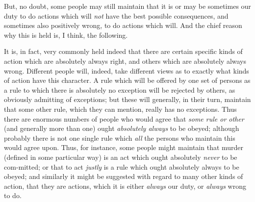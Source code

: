 But, no doubt, some people may still maintain that it is or may be
sometimes our duty to do actions which will \textit{not} have the best
possible consequences, and sometimes  also positively wrong,
to do actions which will. And the chief reason why this is held is, I
think, the following.

It is, in fact, very commonly held indeed that there are certain
specific kinds of action which are absolutely always right, and others
which are absolutely always wrong. Different people will, indeed, take
different views as to exactly what kinds of action have this
character. A rule which will be offered by one set of persons as a
rule to which there is absolutely no exception will be rejected by
others, as obviously admitting of exceptions; but these will
generally, in their turn, maintain that some other rule, which they
can mention, really has no exceptions. Thus there are enormous numbers
of people who would agree that \textit{some rule or other} (and
generally more than one) ought \textit{absolutely always} to be
obeyed; although probably there is not one single rule which
\textit{all} the persons who maintain this would agree upon. Thus, for
instance, some people might maintain that murder (defined in some
particular way) is an act which ought absolutely \textit{never} to be
com-mitted; or that to act \textit{justly} is a rule which
ought absolutely always to be obeyed; and similarly it might be
suggested with regard to many other kinds of action, that they are
actions, which it is either \textit{always} our duty, or
\textit{always} wrong to do.

